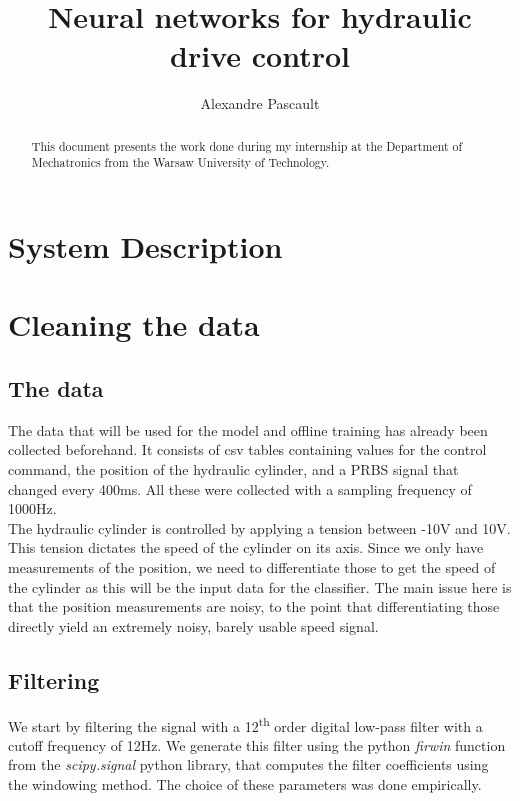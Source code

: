 \documentclass[10pt,a4paper]{report}
\begin{document}
\title{Neural networks for hydraulic drive control}
\author{Alexandre Pascault}
\maketitle
\begin{abstract}
	This document presents the work done during my internship at the Department of Mechatronics from the Warsaw University of Technology.
\end{abstract}

\chapter{System Description}
\label{sec:System Description}

\chapter{Cleaning the data}
\label{sec:Cleaning the data}
\section{The data}
\label{sub:The data}
The data that will be used for the model and offline training has already been collected beforehand. It consists of csv tables containing values for the control command, the position of the hydraulic cylinder, and a PRBS signal that changed every 400ms. All these were collected with a sampling frequency of 1000Hz.
\\
The hydraulic cylinder is controlled by applying a tension between -10V and 10V. This tension dictates the speed of the cylinder on its axis. Since we only have measurements of the position, we need to differentiate those to get the speed of the cylinder as this will be the input data for the classifier. The main issue here is that the position measurements are noisy, to the point that differentiating those directly yield an extremely noisy, barely usable speed signal.

\section{Filtering}
\label{sec:Filtering}

We start by filtering the signal with a 12\textsuperscript{th} order digital low-pass filter with a cutoff frequency of 12Hz. We generate this filter using the python \textit{firwin} function from the \textit{scipy.signal} python library, that computes the filter coefficients using the windowing method. The choice of these parameters was done empirically. 
\end{document}
